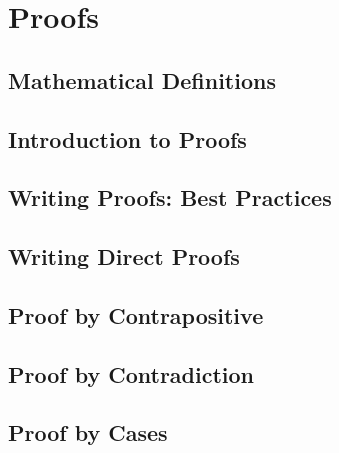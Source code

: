 \section{Proofs}
\subsection{Mathematical Definitions}
\subsection{Introduction to Proofs}
\subsection{Writing Proofs: Best Practices}
\subsection{Writing Direct Proofs}
\subsection{Proof by Contrapositive}
\subsection{Proof by Contradiction}
\subsection{Proof by Cases}
